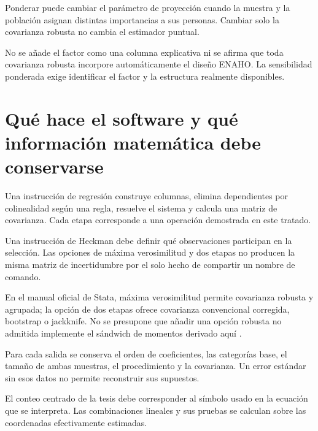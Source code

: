 \documentclass[11pt,a4paper]{article}
\begin{document}
Ponderar puede cambiar el parámetro de proyección cuando la muestra y la población asignan distintas importancias a sus personas. Cambiar solo la covarianza robusta no cambia el estimador puntual.

No se añade el factor como una columna explicativa ni se afirma que toda covarianza robusta incorpore automáticamente el diseño ENAHO. La sensibilidad ponderada exige identificar el factor y la estructura realmente disponibles.

\clearpage
\section{Qué hace el software y qué información matemática debe conservarse}

Una instrucción de regresión construye columnas, elimina dependientes por colinealidad según una regla, resuelve el sistema y calcula una matriz de covarianza. Cada etapa corresponde a una operación demostrada en este tratado.

Una instrucción de Heckman debe definir qué observaciones participan en la selección. Las opciones de máxima verosimilitud y dos etapas no producen la misma matriz de incertidumbre por el solo hecho de compartir un nombre de comando.

En el manual oficial de Stata, máxima verosimilitud permite covarianza robusta y agrupada; la opción de dos etapas ofrece covarianza convencional corregida, bootstrap o jackknife. No se presupone que añadir una opción robusta no admitida implemente el sándwich de momentos derivado aquí \cite{stataheckman}.

Para cada salida se conserva el orden de coeficientes, las categorías base, el tamaño de ambas muestras, el procedimiento y la covarianza. Un error estándar sin esos datos no permite reconstruir sus supuestos.

El conteo centrado de la tesis debe corresponder al símbolo usado en la ecuación que se interpreta. Las combinaciones lineales y sus pruebas se calculan sobre las coordenadas efectivamente estimadas.

\clearpage
\end{document}
